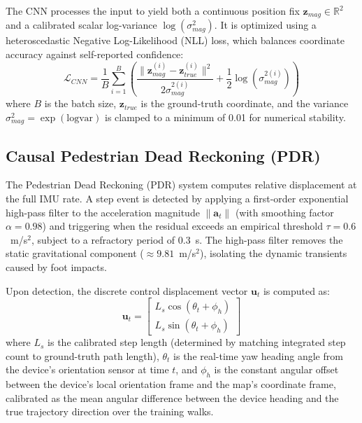 \documentclass[conference]{IEEEtran}
\begin{document}
The CNN processes the input to yield both a continuous position fix $\mathbf{z}_{mag} \in \mathbb{R}^2$ and a calibrated scalar log-variance $\log(\sigma^2_{mag})$. It is optimized using a heteroscedastic Negative Log-Likelihood (NLL) loss, which balances coordinate accuracy against self-reported confidence:
\begin{equation}
\mathcal{L}_{CNN} = \frac{1}{B} \sum_{i=1}^{B} \left( \frac{\| \mathbf{z}_{mag}^{(i)} - \mathbf{z}_{true}^{(i)} \|^2}{2\sigma^{2(i)}_{mag}} + \frac{1}{2}\log(\sigma^{2(i)}_{mag}) \right) \label{eq:nll_loss}
\end{equation}
where $B$ is the batch size, $\mathbf{z}_{true}$ is the ground-truth coordinate, and the variance $\sigma^2_{mag} = \exp(\text{logvar})$ is clamped to a minimum of 0.01 for numerical stability.

\subsection{Causal Pedestrian Dead Reckoning (PDR)}

The Pedestrian Dead Reckoning (PDR) system computes relative displacement at the full IMU rate. A step event is detected by applying a first-order exponential high-pass filter to the acceleration magnitude $\|\mathbf{a}_t\|$ (with smoothing factor $\alpha = 0.98$) and triggering when the residual exceeds an empirical threshold $\tau = 0.6$~m/s$^2$, subject to a refractory period of 0.3~s. The high-pass filter removes the static gravitational component ($\approx 9.81$~m/s$^2$), isolating the dynamic transients caused by foot impacts.

Upon detection, the discrete control displacement vector $\mathbf{u}_t$ is computed as:
\begin{equation}
\mathbf{u}_t = \begin{bmatrix} L_s \cos(\theta_t + \phi_h) \\ L_s \sin(\theta_t + \phi_h) \end{bmatrix} \label{eq:pdr}
\end{equation}
where $L_s$ is the calibrated step length (determined by matching integrated step count to ground-truth path length), $\theta_t$ is the real-time yaw heading angle from the device's orientation sensor at time $t$, and $\phi_h$ is the constant angular offset between the device's local orientation frame and the map's coordinate frame, calibrated as the mean angular difference between the device heading and the true trajectory direction over the training walks. 
\end{document}
